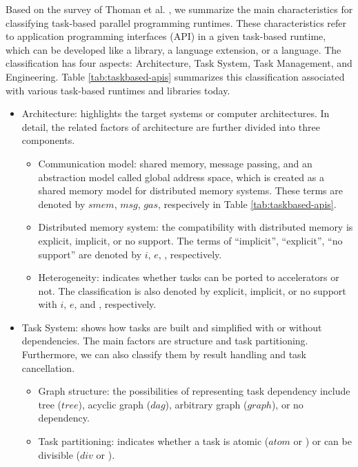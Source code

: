 Based on the survey of Thoman et al. \cite{thoman2018taxonomy}, we summarize the main characteristics for classifying task-based parallel programming runtimes. These characteristics refer to application programming interfaces (API) in a given task-based runtime, which can be developed like a library, a language extension, or a language. The classification has four aspects: Architecture, Task System, Task Management, and Engineering. Table \ref{tab:taskbased-apis} summarizes this classification associated with various task-based runtimes and libraries today.

\begin{itemize}
	\item Architecture: highlights the target systems or computer architectures. In detail, the related factors of architecture are further divided into three components.
		\begin{itemize}
			\item Communication model: shared memory, message passing, and an abstraction model called global address space, which is created as a shared memory model for distributed memory systems. These terms are denoted by $smem$, $msg$, $gas$, respecively in Table \ref{tab:taskbased-apis}.
			\item Distributed memory system: the compatibility with distributed memory is explicit, implicit, or no support. The terms of ``implicit'', ``explicit'', ``no support'' are denoted by $i$, $e$, \xmark, respectively.
			\item Heterogeneity: indicates whether tasks can be ported to accelerators or not. The classification is also denoted by explicit, implicit, or no support with $i$, $e$, and \xmark, respectively.
		\end{itemize}
		
	\item Task System: shows how tasks are built and simplified with or without dependencies. The main factors are structure and task partitioning. Furthermore, we can also classify them by result handling and task cancellation.
		\begin{itemize}
			\item Graph structure: the possibilities of representing task dependency include tree ($tree$), acyclic graph ($dag$), arbitrary graph ($graph$), or no dependency.
			\item Task partitioning: indicates whether a task is atomic ($atom$ or \cmark) or can be divisible ($div$ or \xmark).
		\end{itemize}
	

\end{itemize}
